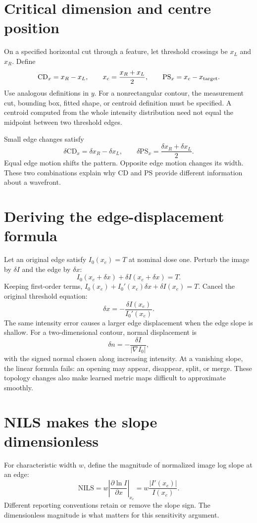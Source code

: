 \section{Critical dimension and centre position}
On a specified horizontal cut through a feature, let threshold crossings
be $x_L$ and $x_R$. Define
\begin{equation}
\mathrm{CD}_x=x_R-x_L,\qquad
x_c=\frac{x_R+x_L}{2},\qquad
\mathrm{PS}_x=x_c-x_{\rm target}.
\label{eq:CDPS}
\end{equation}
Use analogous definitions in $y$. For a nonrectangular contour, the
measurement cut, bounding box, fitted shape, or centroid definition must
be specified. A centroid computed from the whole intensity distribution
need not equal the midpoint between two threshold edges.

Small edge changes satisfy
\begin{equation}
\delta\mathrm{CD}_x=\delta x_R-\delta x_L,\qquad
\delta\mathrm{PS}_x=\frac{\delta x_R+\delta x_L}{2}.
\label{eq:edgecombine}
\end{equation}
Equal edge motion shifts the pattern. Opposite edge motion changes its
width. These two combinations explain why CD and PS provide different
information about a wavefront.

\section{Deriving the edge-displacement formula}
Let an original edge satisfy $I_0(x_e)=T$ at nominal dose one.
Perturb the image by $\delta I$ and the edge by $\delta x$:
\[
I_0(x_e+\delta x)+\delta I(x_e+\delta x)=T.
\]
Keeping first-order terms,
$I_0(x_e)+I_0'(x_e)\delta x+\delta I(x_e)=T$.
Cancel the original threshold equation:
\begin{equation}
\delta x=-\frac{\delta I(x_e)}{I_0'(x_e)}.
\label{eq:edge}
\end{equation}
The same intensity error causes a larger edge displacement when the
edge slope is shallow.
For a two-dimensional contour, normal displacement is
\[
\delta n=-\frac{\delta I}{|\nabla I_0|},
\]
with the signed normal chosen along increasing intensity.
At a vanishing slope, the linear formula fails: an opening may appear,
disappear, split, or merge. These topology changes also make learned
metric maps difficult to approximate smoothly.

\section{NILS makes the slope dimensionless}
For characteristic width $w$, define the magnitude of normalized image
log slope at an edge:
\begin{equation}
\mathrm{NILS}=w\left|\frac{\partial\ln I}{\partial x}\right|_{x_e}
=w\frac{|I'(x_e)|}{I(x_e)}.
\label{eq:nils}
\end{equation}
Different reporting conventions retain or remove the slope sign.
The dimensionless magnitude is what matters for this sensitivity argument.

